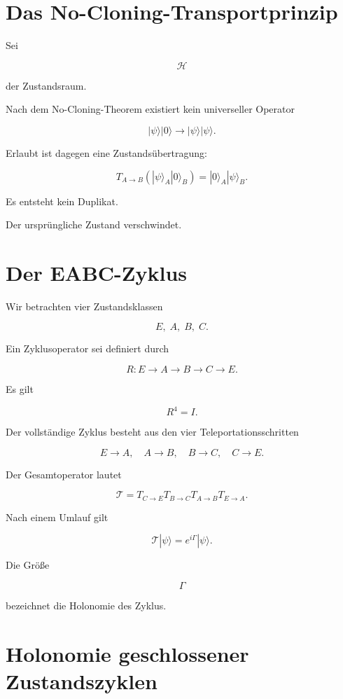 \documentclass[11pt,a4paper]{article}
\begin{document}
	\section{Das No-Cloning-Transportprinzip}
	
	Sei
	
	\[
	\mathcal H
	\]
	
	der Zustandsraum.
	
	Nach dem No-Cloning-Theorem existiert kein universeller Operator
	
	\[
	|\psi\rangle |0\rangle
	\rightarrow
	|\psi\rangle |\psi\rangle.
	\]
	
	Erlaubt ist dagegen eine Zustandsübertragung:
	
	\[
	T_{A\to B}
	\left(
	|\psi\rangle_A |0\rangle_B
	\right)
	=
	|0\rangle_A |\psi\rangle_B.
	\]
	
	Es entsteht kein Duplikat.
	
	Der ursprüngliche Zustand verschwindet.
	
	\section{Der EABC-Zyklus}
	
	Wir betrachten vier Zustandsklassen
	
	\[
	E,\;A,\;B,\;C.
	\]
	
	Ein Zyklusoperator sei definiert durch
	
	\[
	R:
	E\rightarrow A
	\rightarrow B
	\rightarrow C
	\rightarrow E.
	\]
	
	Es gilt
	
	\[
	R^4=I.
	\]
	
	Der vollständige Zyklus besteht aus den vier Teleportationsschritten
	
	\[
	E\rightarrow A,
	\quad
	A\rightarrow B,
	\quad
	B\rightarrow C,
	\quad
	C\rightarrow E.
	\]
	
	Der Gesamtoperator lautet
	
	\[
	\mathcal T
	=
	T_{C\to E}
	T_{B\to C}
	T_{A\to B}
	T_{E\to A}.
	\]
	
	Nach einem Umlauf gilt
	
	\[
	\mathcal T|\psi\rangle
	=
	e^{i\Gamma}
	|\psi\rangle.
	\]
	
	Die Größe
	
	\[
	\Gamma
	\]
	
	bezeichnet die Holonomie des Zyklus.
	
	\section{Holonomie geschlossener Zustandszyklen}
	
\end{document}
